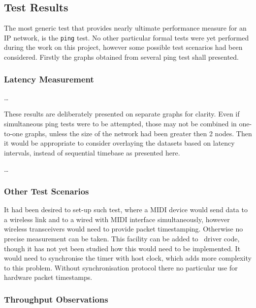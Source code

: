 \subsection{Test Results}

  The most generic test that provides nearly ultimate performance measure
 for an IP network, is the \texttt{ping} test. No other particular formal
 tests were yet performed during the work on this project, however some
 possible test scenarios had been considered. Firstly the graphs obtained
 from several ping test shall presented.

\subsubsection{Latency Measurement}

  \dots

  These results are deliberately presented on separate graphs for clarity.
 Even if simultaneous ping tests were to be attempted, those may not be
 combined in one-to-one graphs, unless the size of the network had been
 greater then 2 nodes. Then it would be appropriate to consider overlaying
 the datasets based on latency intervals, instead of sequential timebase
 as presented here.

  \dots

\subsubsection{Other Test Scenarios}

  It had been desired to set-up such test, where a MIDI device would send
 data to a wireless link and to a wired with MIDI interface simultaneously,
 however wireless transceivers would need to provide packet timestamping.
 Otherwise no precise measurement can be taken. This facility can be added
 to \MCX\ driver code, though it has not yet been studied how this would
 need to be implemented. It would need to synchronise the timer with host
 clock, which adds more complexity to this problem. Without synchronisation
 protocol there no particular use for hardware packet timestamps.

 

\subsubsection{Throughput Observations}

